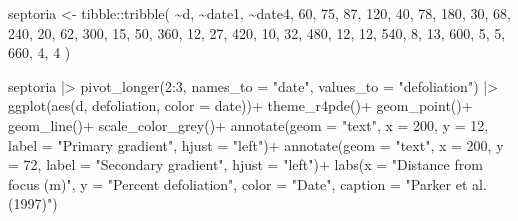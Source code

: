 \documentclass[
  letterpaper,
]{book}
\newenvironment{Shaded}{\begin{snugshade}}{\end{snugshade}}
\newcommand{\AttributeTok}[1]{\textcolor[rgb]{0.40,0.45,0.13}{#1}}
\newcommand{\DecValTok}[1]{\textcolor[rgb]{0.68,0.00,0.00}{#1}}
\newcommand{\FunctionTok}[1]{\textcolor[rgb]{0.28,0.35,0.67}{#1}}
\newcommand{\NormalTok}[1]{\textcolor[rgb]{0.00,0.23,0.31}{#1}}
\newcommand{\OtherTok}[1]{\textcolor[rgb]{0.00,0.23,0.31}{#1}}
\newcommand{\SpecialCharTok}[1]{\textcolor[rgb]{0.37,0.37,0.37}{#1}}
\newcommand{\StringTok}[1]{\textcolor[rgb]{0.13,0.47,0.30}{#1}}
\begin{document}
\begin{Shaded}
\begin{Highlighting}[]
\NormalTok{septoria }\OtherTok{\textless{}{-}} 
\NormalTok{tibble}\SpecialCharTok{::}\FunctionTok{tribble}\NormalTok{(}
 \SpecialCharTok{\textasciitilde{}}\NormalTok{d, }\SpecialCharTok{\textasciitilde{}}\NormalTok{date1, }\SpecialCharTok{\textasciitilde{}}\NormalTok{date4,}
 \DecValTok{60}\NormalTok{,     }\DecValTok{75}\NormalTok{,    }\DecValTok{87}\NormalTok{,}
 \DecValTok{120}\NormalTok{,    }\DecValTok{40}\NormalTok{,    }\DecValTok{78}\NormalTok{,}
 \DecValTok{180}\NormalTok{,    }\DecValTok{30}\NormalTok{,    }\DecValTok{68}\NormalTok{,}
 \DecValTok{240}\NormalTok{,    }\DecValTok{20}\NormalTok{,    }\DecValTok{62}\NormalTok{,}
 \DecValTok{300}\NormalTok{,    }\DecValTok{15}\NormalTok{,    }\DecValTok{50}\NormalTok{,}
 \DecValTok{360}\NormalTok{,    }\DecValTok{12}\NormalTok{,    }\DecValTok{27}\NormalTok{,}
 \DecValTok{420}\NormalTok{,    }\DecValTok{10}\NormalTok{,    }\DecValTok{32}\NormalTok{,}
 \DecValTok{480}\NormalTok{,    }\DecValTok{12}\NormalTok{,    }\DecValTok{12}\NormalTok{,}
 \DecValTok{540}\NormalTok{,     }\DecValTok{8}\NormalTok{,    }\DecValTok{13}\NormalTok{,}
 \DecValTok{600}\NormalTok{,     }\DecValTok{5}\NormalTok{,     }\DecValTok{5}\NormalTok{,}
 \DecValTok{660}\NormalTok{,     }\DecValTok{4}\NormalTok{,     }\DecValTok{4}
\NormalTok{                )}

\NormalTok{septoria }\SpecialCharTok{|\textgreater{}} 
  \FunctionTok{pivot\_longer}\NormalTok{(}\DecValTok{2}\SpecialCharTok{:}\DecValTok{3}\NormalTok{, }\AttributeTok{names\_to =} \StringTok{"date"}\NormalTok{, }
               \AttributeTok{values\_to =} \StringTok{"defoliation"}\NormalTok{) }\SpecialCharTok{|\textgreater{}} 
  \FunctionTok{ggplot}\NormalTok{(}\FunctionTok{aes}\NormalTok{(d, defoliation, }\AttributeTok{color =}\NormalTok{ date))}\SpecialCharTok{+}
  \FunctionTok{theme\_r4pde}\NormalTok{()}\SpecialCharTok{+}
  \FunctionTok{geom\_point}\NormalTok{()}\SpecialCharTok{+}
  \FunctionTok{geom\_line}\NormalTok{()}\SpecialCharTok{+}
  \FunctionTok{scale\_color\_grey}\NormalTok{()}\SpecialCharTok{+}
  \FunctionTok{annotate}\NormalTok{(}\AttributeTok{geom =} \StringTok{"text"}\NormalTok{, }\AttributeTok{x =} \DecValTok{200}\NormalTok{, }\AttributeTok{y =} \DecValTok{12}\NormalTok{, }
           \AttributeTok{label =} \StringTok{"Primary gradient"}\NormalTok{, }\AttributeTok{hjust =} \StringTok{"left"}\NormalTok{)}\SpecialCharTok{+}
  \FunctionTok{annotate}\NormalTok{(}\AttributeTok{geom =} \StringTok{"text"}\NormalTok{, }\AttributeTok{x =} \DecValTok{200}\NormalTok{, }\AttributeTok{y =} \DecValTok{72}\NormalTok{, }
           \AttributeTok{label =} \StringTok{"Secondary gradient"}\NormalTok{, }\AttributeTok{hjust =} \StringTok{"left"}\NormalTok{)}\SpecialCharTok{+}
  \FunctionTok{labs}\NormalTok{(}\AttributeTok{x =} \StringTok{"Distance from focus (m)"}\NormalTok{,}
       \AttributeTok{y =} \StringTok{"Percent defoliation"}\NormalTok{,}
       \AttributeTok{color =} \StringTok{"Date"}\NormalTok{,}
       \AttributeTok{caption =} \StringTok{"Parker et al. (1997)"}\NormalTok{)}
\end{Highlighting}
\end{Shaded}
\end{document}
